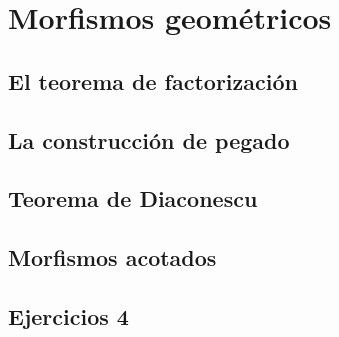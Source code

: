 \chapter{Morfismos geométricos}
\label{cap:4}

\section{El teorema de factorización}
\label{sec:4.1}

\section{La construcción de pegado}
\label{sec:4.2}

\section{Teorema de Diaconescu}
\label{sec:4.3}

\section{Morfismos acotados}
\label{sec:4.4}

\section*{Ejercicios 4}
\label{sec:ejercicios-4}
